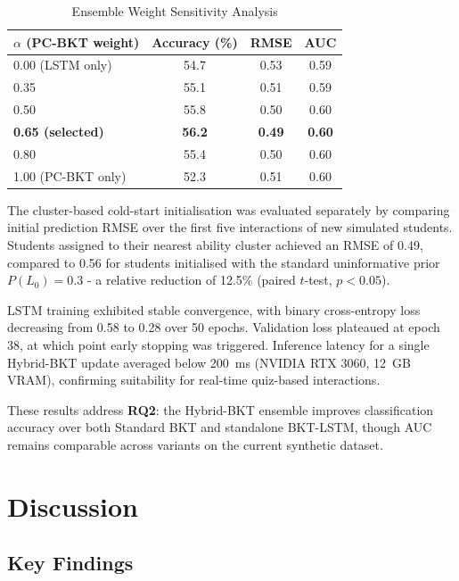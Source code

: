 \documentclass[conference]{IEEEtran}
\begin{document}
\begin{table}[htbp]
\caption{Ensemble Weight Sensitivity Analysis}
\begin{center}
\begin{tabular}{|l|c|c|c|}
\hline
\textbf{$\alpha$ (PC-BKT weight)} & \textbf{Accuracy (\%)} & \textbf{RMSE} & \textbf{AUC} \\
\hline
0.00 (LSTM only) & 54.7 & 0.53 & 0.59 \\
\hline
0.35 & 55.1 & 0.51 & 0.59 \\
\hline
0.50 & 55.8 & 0.50 & 0.60 \\
\hline
\textbf{0.65 (selected)} & \textbf{56.2} & \textbf{0.49} & \textbf{0.60} \\
\hline
0.80 & 55.4 & 0.50 & 0.60 \\
\hline
1.00 (PC-BKT only) & 52.3 & 0.51 & 0.60 \\
\hline
\end{tabular}
\label{tab:alpha}
\end{center}
\end{table}

The cluster-based cold-start initialisation was evaluated separately by comparing initial prediction RMSE over the first five interactions of new simulated students. Students assigned to their nearest ability cluster achieved an RMSE of 0.49, compared to 0.56 for students initialised with the standard uninformative prior $P(L_0) = 0.3$ - a relative reduction of 12.5\% (paired $t$-test, $p < 0.05$).

LSTM training exhibited stable convergence, with binary cross-entropy loss decreasing from 0.58 to 0.28 over 50 epochs. Validation loss plateaued at epoch 38, at which point early stopping was triggered. Inference latency for a single Hybrid-BKT update averaged below 200~ms (NVIDIA RTX 3060, 12~GB VRAM), confirming suitability for real-time quiz-based interactions.

These results address \textbf{RQ2}: the Hybrid-BKT ensemble improves classification accuracy over both Standard BKT and standalone BKT-LSTM, though AUC remains comparable across variants on the current synthetic dataset.

\section{Discussion}

\subsection{Key Findings}
\end{document}
